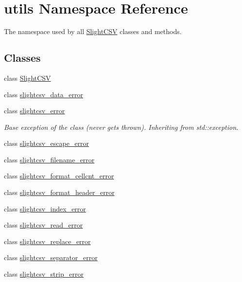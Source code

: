 \hypertarget{namespaceutils}{}\section{utils Namespace Reference}
\label{namespaceutils}


The namespace used by all \hyperlink{classutils_1_1SlightCSV}{Slight\+C\+SV} classes and methods.  


\subsection*{Classes}
\begin{DoxyCompactItemize}
\item 
class \hyperlink{classutils_1_1SlightCSV}{Slight\+C\+SV}
\item 
class \hyperlink{classutils_1_1slightcsv__data__error}{slightcsv\+\_\+data\+\_\+error}
\item 
class \hyperlink{classutils_1_1slightcsv__error}{slightcsv\+\_\+error}
\begin{DoxyCompactList}\small\item\em Base exception of the class (never gets thrown). Inheriting from std\+::exception. \end{DoxyCompactList}\item 
class \hyperlink{classutils_1_1slightcsv__escape__error}{slightcsv\+\_\+escape\+\_\+error}
\item 
class \hyperlink{classutils_1_1slightcsv__filename__error}{slightcsv\+\_\+filename\+\_\+error}
\item 
class \hyperlink{classutils_1_1slightcsv__format__cellcnt__error}{slightcsv\+\_\+format\+\_\+cellcnt\+\_\+error}
\item 
class \hyperlink{classutils_1_1slightcsv__format__header__error}{slightcsv\+\_\+format\+\_\+header\+\_\+error}
\item 
class \hyperlink{classutils_1_1slightcsv__index__error}{slightcsv\+\_\+index\+\_\+error}
\item 
class \hyperlink{classutils_1_1slightcsv__read__error}{slightcsv\+\_\+read\+\_\+error}
\item 
class \hyperlink{classutils_1_1slightcsv__replace__error}{slightcsv\+\_\+replace\+\_\+error}
\item 
class \hyperlink{classutils_1_1slightcsv__separator__error}{slightcsv\+\_\+separator\+\_\+error}
\item 
class \hyperlink{classutils_1_1slightcsv__strip__error}{slightcsv\+\_\+strip\+\_\+error}

\end{DoxyCompactItemize}
